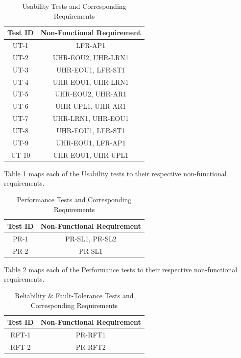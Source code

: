 \documentclass[12pt, titlepage]{article}
\begin{document}
\begin{table}[H]
  \centering
  \caption{Usability Tests and Corresponding Requirements}
  \label{tab:nfr-trace-us}
  \begin{tabular}{cc}
    \toprule \textbf{Test ID} & \textbf{Non-Functional Requirement} \\
    \midrule
    UT-1 & LFR-AP1 \\
    UT-2 & UHR-EOU2, UHR-LRN1 \\
    UT-3 & UHR-EOU1, LFR-ST1 \\
    UT-4 & UHR-EOU1, UHR-LRN1 \\
    UT-5 & UHR-EOU2, UHR-AR1 \\
    UT-6 & UHR-UPL1, UHR-AR1 \\
    UT-7 & UHR-LRN1, UHR-EOU1 \\
    UT-8 & UHR-EOU1, LFR-ST1 \\
    UT-9 & UHR-EOU1, LFR-AP1 \\
    UT-10 & UHR-EOU1, UHR-UPL1 \\
    \bottomrule
  \end{tabular}
\end{table}

Table \ref{tab:nfr-trace-us} maps each of the Usability tests to their respective 
non-functional requirements.


\begin{table}[H]
  \centering
  \caption{Performance Tests and Corresponding Requirements}
  \begin{tabular}{cc}
    \toprule \textbf{Test ID} & \textbf{Non-Functional Requirement} \\
    \midrule
    PR-1 & PR-SL1, PR-SL2 \\
    PR-2 & PR-SL1 \\
    \bottomrule
  \end{tabular}
  \label{tab:nfr-trace-perf}
\end{table}

Table \ref{tab:nfr-trace-perf} maps each of the Performance tests to their 
respective non-functional requirements.

\begin{table}[H]
  \centering
  \caption{Reliability \& Fault-Tolerance Tests and Corresponding Requirements}
  \begin{tabular}{cc}
    \toprule \textbf{Test ID} & \textbf{Non-Functional Requirement} \\
    \midrule
    RFT-1 & PR-RFT1 \\
    RFT-2 & PR-RFT2 \\
    \bottomrule
  \end{tabular}
  \label{tab:nfr-trace-rft}
\end{table}
\end{document}

